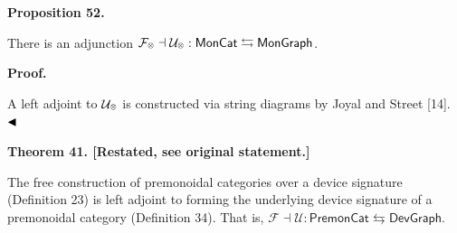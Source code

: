  
 
 
\par\medskip\noindent\textbf{Proposition 52.}\par
 
 
There is an adjunction $\mathcal{F}_{\mathbin{\raisebox{1.25pt}{$\scriptscriptstyle\otimes$}}}\dashv\mathcal{U}_{\mathbin{\raisebox{1.25pt}{$\scriptscriptstyle\otimes$}}}:\mathsf{MonCat}\leftrightarrows\mathsf{MonGraph}$.\par
 
 
 
 
 
\par\medskip\noindent\textbf{Proof.}\par
 
 
A left adjoint to $\mathcal{U}_{\mathbin{\raisebox{1.25pt}{$\scriptscriptstyle\otimes$}}}$ is constructed via string diagrams by Joyal and Street [14]. $\hfill\blacktriangleleft$\par
 
 
 
 
\par\medskip\noindent\textbf{Theorem 41. [Restated, see original statement.]}\par
 
 
The free construction of premonoidal categories over a device signature (Definition 23) is left adjoint to forming the underlying device signature of a premonoidal category (Definition 34). That is, $\mathcal{F}\dashv\mathcal{U}:\mathsf{PremonCat}\leftrightarrows\mathsf{DevGraph}.$\par
 
 
 
 
 
